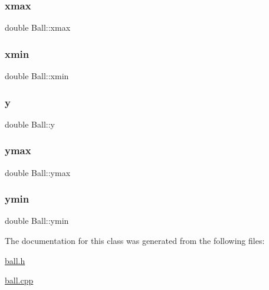 \subsubsection{\texorpdfstring{xmax}{xmax}}
{\footnotesize\ttfamily double Ball\+::xmax\hspace{0.3cm}{\ttfamily [protected]}}

\mbox{\label{classBall_ad100dde6b63de229a2bc86b9094526e1}} 
\subsubsection{\texorpdfstring{xmin}{xmin}}
{\footnotesize\ttfamily double Ball\+::xmin\hspace{0.3cm}{\ttfamily [protected]}}

\mbox{\label{classBall_a17d73231eab81d0e74cf28d0068fe5cb}} 
\subsubsection{\texorpdfstring{y}{y}}
{\footnotesize\ttfamily double Ball\+::y\hspace{0.3cm}{\ttfamily [protected]}}

\mbox{\label{classBall_ada883fa45e2bc0cbcd04fec775bfcc89}} 
\subsubsection{\texorpdfstring{ymax}{ymax}}
{\footnotesize\ttfamily double Ball\+::ymax\hspace{0.3cm}{\ttfamily [protected]}}

\mbox{\label{classBall_a01797d790fe45fc9294edece2ff72c5b}} 
\subsubsection{\texorpdfstring{ymin}{ymin}}
{\footnotesize\ttfamily double Ball\+::ymin\hspace{0.3cm}{\ttfamily [protected]}}



The documentation for this class was generated from the following files\+:\begin{DoxyCompactItemize}
\item 
\hyperlink{ball_8h}{ball.\+h}\item 
\hyperlink{ball_8cpp}{ball.\+cpp}\end{DoxyCompactItemize}
